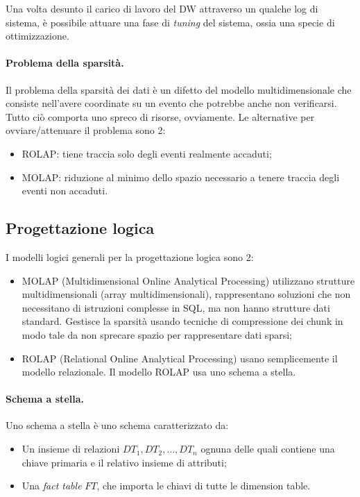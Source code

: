 \documentclass[a4paper, 10pt]{article}
\begin{document}
	Una volta desunto il carico di lavoro del DW attraverso un qualche log di sistema, è possibile attuare una fase di \textit{tuning} del sistema, ossia una specie di ottimizzazione.
	
	\paragraph{Problema della sparsità.} Il problema della sparsità dei dati è un difetto del modello multidimensionale che consiste nell'avere coordinate su un evento che potrebbe anche non verificarsi. Tutto ciò comporta uno spreco di risorse, ovviamente. Le alternative per ovviare/attenuare il problema sono 2: \begin{itemize}
		\item ROLAP: tiene traccia solo degli eventi realmente accaduti;
		\item MOLAP: riduzione al minimo dello spazio necessario a tenere traccia degli eventi non accaduti.
	\end{itemize}

	\subsection{Progettazione logica}
	I modelli logici generali per la progettazione logica sono 2:\begin{itemize}
		\item MOLAP (Multidimensional Online Analytical Processing) utilizzano strutture multidimensionali (array multidimensionali), rappresentano soluzioni che non necessitano di istruzioni complesse in SQL, ma non hanno strutture dati standard. Gestisce la sparsità usando tecniche di compressione dei chunk in modo tale da non sprecare spazio per rappresentare dati sparsi;
		
		\item ROLAP (Relational Online Analytical Processing) usano semplicemente il modello relazionale. Il modello ROLAP usa uno schema a stella.
	\end{itemize}

	\paragraph{Schema a stella.} Uno schema a stella è uno schema caratterizzato da: \begin{itemize}
		\item Un insieme di relazioni $DT_1, DT_2, \dots, DT_n$ ognuna delle quali contiene una chiave primaria e il relativo insieme di attributi;
		
		\item Una \textit{fact table} $FT$, che importa le chiavi di tutte le dimension table.
	\end{itemize}
\end{document}

